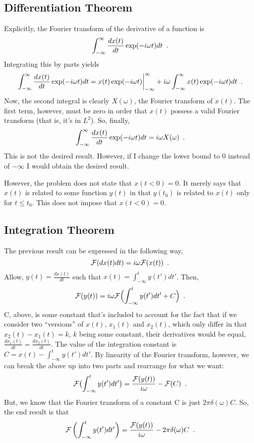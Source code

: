 \begin{homeworkProblem}
   \subsection{Differentiation Theorem}
   \label{sub:differentiation_theorem}

   Explicitly, the Fourier transform of the derivative of a function is
   \[
      \int_{-\infty}^{\infty} \frac{dx(t)}{dt} \exp(- i \omega t) dt \enskip.
   \]
   Integrating this by parts yields
   \[
      \int_{-\infty}^{\infty} \frac{dx(t)}{dt} \exp(- i \omega t) dt =
      x(t) \exp(- i \omega t) \bigg|_{-\infty}^{\infty} + i \omega
      \int_{-\infty}^{\infty} x(t) \exp(-i\omega t) dt \enskip.
   \]
   Now, the second integral is clearly $ X(\omega) $, the Fourier transform of $
   x(t) $. The first term, however, must be zero in order that $ x(t) $ possess
   a valid Fourier transform (that is, it's in $ L^{2} $). So, finally,
   \[
      \int_{-\infty}^{\infty} \frac{dx(t)}{dt} \exp(- i \omega t) dt =
      i \omega X(\omega) \enskip.
   \]
   This is not the desired result. However, if I change the lower bound to $ 0 $
   instead of $ -\infty $ I would obtain the desired result.

   However, the problem does not state that $ x(t < 0) = 0 $. It merely says
   that $ x(t) $ is related to some function $ y(t) $ in that $ y(t_{0}) $ is
   related to $ x(t) $ only for $ t \le t_{0} $. This does not impose that $
   x(t<0) =0 $.
   \subsection{Integration Theorem}
   \label{sub:integration_theorem}

   The previous result can be expressed in the following way,
   \[
      \mathcal{F}(d x(t) dt) = i \omega \mathcal{F}(x(t)) \enskip.
   \]
   Allow, $ y(t) = \frac{dx(t)}{dt} $ such that $ x(t) = \int_{-\infty}^{t} y(t')
   dt'$. Then,
   \[
      \mathcal{F}(y(t)) = i \omega
      \mathcal{F}\Bigl(\int_{-\infty}^{t}y(t')dt' + C \Bigr) \enskip.
   \]
   C, above, is some constant that's included to account for the fact that if we
   consider two ``versions'' of $ x(t) $, $ x_{1}(t) $ and $ x_{2}(t) $, which
   only differ in that $ x_{2}(t) - x_{1}(t) = k $, $k$ being some constant, their
   derivatives would be equal, $ \frac{dx_{1}(t)}{dt} = \frac{dx_{2}(t)}{dt} $.
   The value of the integration constant is $ C = x(t) -
   \int_{-\infty}^{t}y(t')dt' $. By linearity of the Fourier transform, however,
   we can break the above up into two parts and rearrange for what we want:
   \[
      \mathcal{F}\bigl(\int_{-\infty}^{t}y(t') dt'\bigr) =
      \frac{\mathcal{F}(y(t))}{i\omega} - \mathcal{F}(C) \enskip.
   \]
   But, we know that the Fourier transform of a constant C is just $ 2 \pi
   \delta(\omega) C $. So, the end result is that
   \[
      \mathcal{F}\left(\int_{-\infty}^{t}y(t')dt'\right) = \frac{\mathcal{F}(y(t))}{i\omega}
         - 2 \pi \delta(\omega)C \enskip.
   \]


\end{homeworkProblem}
